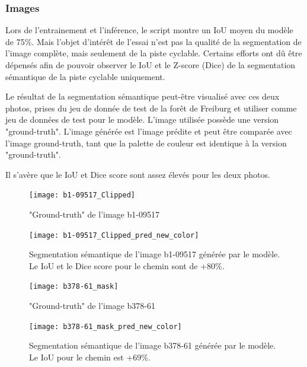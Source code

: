 \subsubsection{Images}
\par Lors de l'entrainement et l'inférence, le script montre un IoU moyen du modèle de 75\%. Mais l'objet d'intérêt de l'essai n'est pas la qualité de la segmentation de l'image complète, mais seulement de la piste cyclable. Certains efforts ont dû être dépensés afin de pouvoir observer le IoU et le Z-score (Dice) de la segmentation sémantique de la piste cyclable uniquement. 
\par Le résultat de la segmentation sémantique peut-être visualisé avec ces deux photos, prises du jeu de donnée de test de la forêt de Freiburg et utiliser comme jeu de données de test pour le modèle. L'image utilisée possède une version "ground-truth". L'image générée est l'image prédite et peut être comparée avec l'image ground-truth, tant que la palette de couleur est identique à la version "ground-truth". 
\par Il s'avère que le IoU et Dice score sont assez élevés pour les deux photos. 
\begin{figure}[H]
   \centering
   \texttt{[image: b1-09517\_Clipped]}
   \caption{"Ground-truth" de l'image b1-09517}
   \label{fig:b1-09517_Clipped}
\end{figure}
\begin{figure}[H]
   \centering
   \texttt{[image: b1-09517\_Clipped\_pred\_new\_color]}
   \caption{Segmentation sémantique de l'image b1-09517 générée par le modèle. Le IoU et le Dice score pour le chemin sont de +80\%.}
   \label{fig:b1-09517_Clipped_pred_new_color}
\end{figure}
\begin{figure}[H]
   \centering
   \texttt{[image: b378-61\_mask]}
   \caption{"Ground-truth" de l'image b378-61}
   \label{fig:b378-61_mask}
\end{figure}
\begin{figure}[H]
   \centering
   \texttt{[image: b378-61\_mask\_pred\_new\_color]}
   \caption{Segmentation sémantique de l'image b378-61 générée par le modèle. Le IoU pour le chemin est +69\%.}
   \label{fig:b378-61_mask_pred_new_color}
\end{figure}

